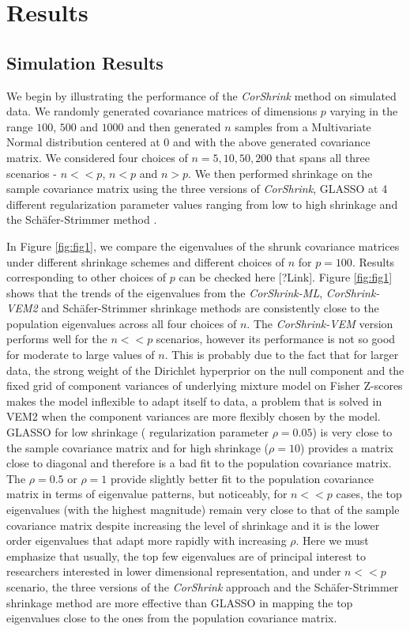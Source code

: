 
\section{Results}

\subsection{Simulation Results}

We begin by illustrating the performance of the \textit{CorShrink} method on simulated data. We randomly generated covariance matrices of dimensions $p$ varying in the range $100$, $500$ and $1000$ and then generated $n$ samples from a Multivariate Normal distribution centered at $0$ and with the above generated covariance matrix. We considered four choices of $n = 5, 10, 50, 200$ that spans all three scenarios -  $n << p$, $n <p$ and $ n > p$.  We then performed shrinkage on the sample covariance matrix using the three versions of \textit{CorShrink}, GLASSO at 4 different regularization parameter values ranging from low to high shrinkage and the Sch\"{a}fer-Strimmer method \cite{Friedman2008} \cite{Witten2010} \cite{Schafer2005}. 

In Figure \ref{fig:fig1}, we compare the eigenvalues of the shrunk covariance matrices under different shrinkage schemes and different choices of $n$ for $p=100$. Results corresponding to other choices of $p$ can be checked here [?Link].    Figure \ref{fig:fig1} shows that the trends of the eigenvalues from the \textit{CorShrink-ML},  \textit{CorShrink-VEM2} and Sch\"{a}fer-Strimmer shrinkage methods are consistently close to the population eigenvalues across all four choices of $n$. The \textit{CorShrink-VEM} version performs well for the $n <<p$ scenarios, however its performance is not so good for moderate to large values of $n$. This is probably due to the fact that for larger data, the strong weight of the Dirichlet hyperprior on the null component and the fixed grid of component variances of underlying mixture model on Fisher Z-scores makes the model inflexible to adapt itself to data, a problem that is solved in VEM2 when the component variances are more flexibly chosen by the model. GLASSO for low shrinkage ( regularization parameter $\rho = 0.05$) is very close to the sample covariance matrix and for high shrinkage ($\rho=10$) provides a matrix close to diagonal and therefore is a bad fit to the population covariance matrix. The $\rho=0.5$ or $\rho = 1$ provide slightly better fit to the population covariance matrix in terms of eigenvalue patterns, but noticeably, for $n << p$ cases, the top eigenvalues (with the highest magnitude) remain very close to that of the sample covariance matrix despite increasing the level of shrinkage and it is the lower order eigenvalues that adapt more rapidly with increasing $\rho$. Here we must emphasize that usually, the top few eigenvalues are of principal interest to researchers interested in lower dimensional representation, and under $n << p$ scenario, the three versions of the \textit{CorShrink} approach and the Sch\"{a}fer-Strimmer shrinkage method are more effective than GLASSO in mapping the top eigenvalues close to the ones from the population covariance matrix. 

